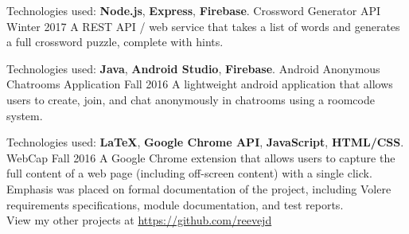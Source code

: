 
\begin{cventries}
  
  \cventry
    {Technologies used: \textbf{Node.js}, \textbf{Express}, \textbf{Firebase}.}
    {Crossword Generator API}
    {}
    {Winter 2017}
    {A REST API / web service that takes a list of words and generates a full crossword puzzle, complete with hints. }
  
  \cventry
    {Technologies used: \textbf{Java}, \textbf{Android Studio}, \textbf{Firebase}.}
    {Android Anonymous Chatrooms Application}
    {}
    {Fall 2016}
    {A lightweight android application that allows users to create, join, and chat anonymously in chatrooms using a roomcode system. }
  
  \cventry
  {Technologies used: \textbf{LaTeX}, \textbf{Google Chrome API}, \textbf{JavaScript}, \textbf{HTML/CSS}.}
  {WebCap}
  {}
  {Fall 2016}
  {A Google Chrome extension that allows users to capture the full content of a web page (including off-screen content) with a single click. Emphasis was placed on formal documentation of the project, including Volere requirements specifications, module documentation, and test reports. 
}\\[3mm]
        
View my other projects at \href{https://github.com/reevejd}{https://github.com/reevejd}
    
\end{cventries}
